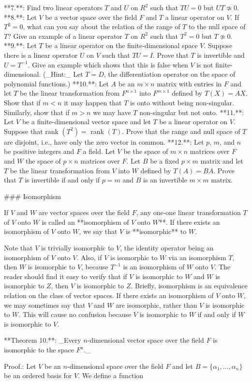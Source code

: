 

**7.**: Find two linear operators \(T\) and \(U\) on \(R^{2}\) such that \(TU=0\) but \(UT\not\simeq 0\).
**8.**: Let \(V\) be a vector space over the field \(F\) and \(T\) a linear operator on \(V\). If \(T^{2}=0\), what can you say about the relation of the range of \(T\) to the null space of \(T\)? Give an example of a linear operator \(T\) on \(R^{2}\) such that \(T^{2}=0\) but \(T\not\simeq 0\).
**9.**: Let \(T\) be a linear operator on the finite-dimensional space \(V\). Suppose there is a linear operator \(U\) on \(V\) such that \(TU=I\). Prove that \(T\) is invertible and \(U=T^{-1}\). Give an example which shows that this is false when \(V\) is not finite-dimensional. (_Hint:_ Let \(T=D\), the differentiation operator on the space of polynomial functions.)
**10.**: Let \(A\) be an \(m\times n\) matrix with entries in \(F\) and let \(T\) be the linear transformation from \(F^{n\times 1}\) into \(F^{m\times 1}\) defined by \(T(X)=AX\). Show that if \(m<n\) it may happen that \(T\) is onto without being non-singular. Similarly, show that if \(m>n\) we may have \(T\) non-singular but not onto.
**11.**: Let \(V\) be a finite-dimensional vector space and let \(T\) be a linear operator on \(V\). Suppose that rank \((T^{2})=\) rank \((T)\). Prove that the range and null space of \(T\) are disjoint, i.e., have only the zero vector in common.
**12.**: Let \(p\), \(m\), and \(n\) be positive integers and \(F\) a field. Let \(V\) be the space of \(m\times n\) matrices over \(F\) and \(W\) the space of \(p\times n\) matrices over \(F\). Let \(B\) be a fixed \(p\times m\) matrix and let \(T\) be the linear transformation from \(V\) into \(W\) defined by \(T(A)=BA\). Prove that \(T\) is invertible if and only if \(p=m\) and \(B\) is an invertible \(m\times m\) matrix.

### Isomorphism

If \(V\) and \(W\) are vector spaces over the field \(F\), any one-one linear transformation \(T\) of \(V\) onto \(W\) is called an **isomorphism of \(V\) onto \(W\)**. If there exists an isomorphism of \(V\) onto \(W\), we say that \(V\) is **isomorphic** to \(W\).

Note that \(V\) is trivially isomorphic to \(V\), the identity operator being an isomorphism of \(V\) onto \(V\). Also, if \(V\) is isomorphic to \(W\) via an isomorphism \(T\), then \(W\) is isomorphic to \(V\), because \(T^{-1}\) is an isomorphism of \(W\) onto \(V\). The reader should find it easy to verify that if \(V\) is isomorphic to \(W\) and \(W\) is isomorphic to \(Z\), then \(V\) is isomorphic to \(Z\). Briefly, isomorphism is an equivalence relation on the class of vector spaces. If there exists an isomorphism of \(V\) onto \(W\), we may sometimes say that \(V\) and \(W\) are isomorphic, rather than \(V\) is isomorphic to \(W\). This will cause no confusion because \(V\) is isomorphic to \(W\) if and only if \(W\) is isomorphic to \(V\).

**Theorem 10.**: _Every \(n\)-dimensional vector space over the field \(F\) is isomorphic to the space \(F^{n}\)._

Proof.: Let \(V\) be an \(n\)-dimensional space over the field \(F\) and let \(B=\{\alpha_{1},\ldots,\alpha_{n}\}\) be an ordered basis for \(V\). We define a function